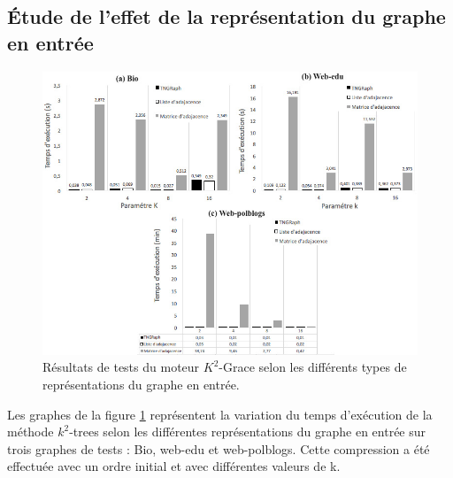 	\subsection{Étude de l'effet de la représentation du graphe en entrée}
			
				\begin{figure}[H]
		\begin{center}
			
			\includegraphics[scale=0.6]{ressources/image/Tests/tst.jpg}
			\caption{Résultats de tests du moteur $K^2$-Grace selon les différents types de représentations du graphe en entrée.}
			\label{fig:test-rep}
		\end{center}
	\end{figure}
			
Les graphes de la figure  \ref{fig:test-rep} représentent la variation du temps d'exécution de la méthode $k^2$-trees selon les différentes représentations du graphe en entrée  sur trois graphes de tests : Bio, web-edu et web-polblogs. Cette compression a été effectuée avec un ordre initial et avec différentes valeurs de k. 

